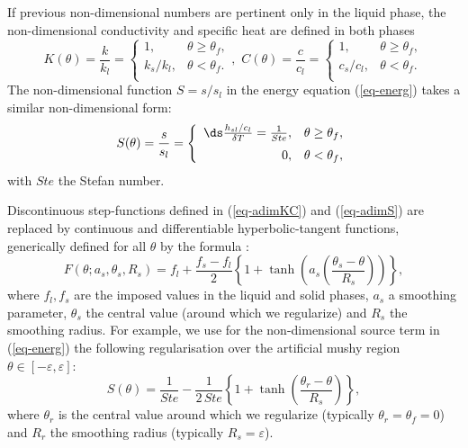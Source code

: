 If previous non-dimensional numbers are pertinent only in the liquid phase, the non-dimensional conductivity and specific heat are  defined in both phases
\begin{equation}\label{eq-adimKC}
K(\theta)= \frac{k}{k_l} =\left\{
\begin{matrix}
1, & \theta \geq \theta_f ,\\
k_s/k_l, & \theta < \theta_f .\\
\end{matrix}
\right.
, \,  \, C(\theta) = \frac{c}{c_l}=\left\{
\begin{matrix}
1, & \theta \geq \theta_f ,\\
c_s/c_l, & \theta < \theta_f .\\
\end{matrix}
\right.
\end{equation}
The non-dimensional function $S = s/s_l$ in the energy equation (\ref{eq-energ}) takes a similar non-dimensional form:
\begin{equation}\label{eq-adimS}
S(\theta)= \frac{s}{s_l} =\left\{
\begin{array}{rl} \vspace{0.2cm}
\ds \frac{h_{sl}/c_l}{\delta T} = \frac{1}{Ste}, & \theta \geq \theta_f ,\\
0, & \theta < \theta_f,\\
\end{array}
\right.
\end{equation}
with $Ste$ the Stefan number.

Discontinuous step-functions defined in (\ref{eq-adimKC})  and (\ref{eq-adimS}) are replaced by continuous and differentiable hyperbolic-tangent functions, generically defined for all $\theta$ by the formula \citep{dan-2014-JCP}:
\begin{equation}
F(\theta; a_s, \theta_s, R_s) = f_l + \frac{f_s-f_l}{2}\left\{
1 + \tanh\left( a_s \left(\frac{\theta_s-\theta}{R_s}\right)\right)
\right\},
\label{eq-smooth}
\end{equation}
where $f_l, f_s$ are the imposed values in the liquid and solid phases, $a_s$ a smoothing  parameter, $\theta_s$ the central value (around which we regularize) and $R_s$ the smoothing radius. For example, we use for the non-dimensional source term in (\ref{eq-energ}) the following regularisation over the artificial mushy region $\theta \in [-\varepsilon, \varepsilon]$:
\begin{equation}
S(\theta) = \frac{1}{Ste} - \frac{1}{2\,Ste}\left\{
1 + \tanh\left(\frac{\theta_r-\theta}{R_s}\right)
\right\},
\label{eq-Stanh}
\end{equation} 
where $\theta_r$ is the central value around which we regularize (typically $\theta_r=\theta_f=0$) and $R_r$ the smoothing radius (typically $R_s=\varepsilon$). 

